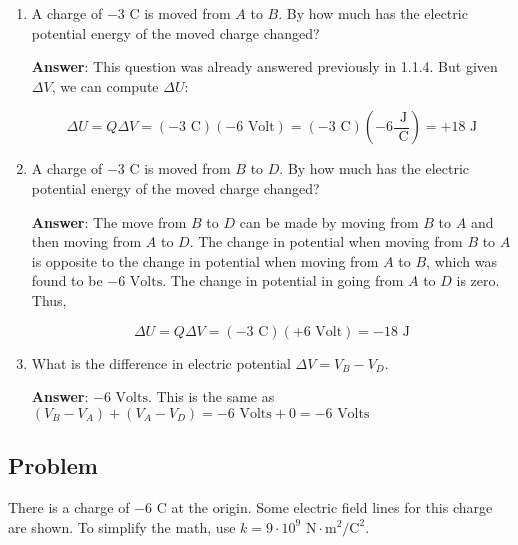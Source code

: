 \documentclass{article}
\begin{document}
\begin{enumerate}
        \vskip 48pt
        \fi

  \item A charge of $-3\text{ C}$ is moved from $A$ to $B$. By how much has the electric potential energy of the moved charge changed?

        \ifsolutions
        {\bf Answer}: This question was already answered previously in 1.1.4. But given $\Delta V$, we can compute $\Delta U$:

        $$
         \Delta U = Q\Delta V=(-3\text{ C})(-6\text{ Volt})=(-3\text{ C})\left(-6\frac{\text{ J}}{ \text{ C}}\right)=+18\text{ J}
        $$
        \else

        \vskip 48pt
        \fi

  \item A charge of $-3\text{ C}$ is moved from $B$ to $D$. By how much has the electric potential energy of the moved charge changed?

        \ifsolutions
        {\bf Answer}: The move from $B$ to $D$ can be made by moving from $B$ to $A$ and then moving from $A$ to $D$. The change in potential when moving from $B$ to $A$ is opposite to the change in potential when moving from $A$ to $B$, which was found to be $-6\text{ Volts}$. The change in potential in going from $A$ to $D$ is zero. Thus,

        $$
         \Delta U = Q\Delta V=(-3\text{ C})(+6\text{ Volt})=-18\text{ J}
        $$
        \else

        \vskip 48pt
        \fi

  \item What is the difference in electric potential $\Delta V = V_B-V_D$.

        \ifsolutions
        {\bf Answer}: $-6\text{ Volts}$. This is the same as $(V_B - V_A) + (V_A - V_D) = -6\text{ Volts} + 0 = -6\text{ Volts}$
        \else

        \vskip 48pt
        \fi

\end{enumerate}

\newpage

\subsection{Problem}

There is a charge of $-6\text{ C}$ at the origin. Some electric field lines for this charge are shown. To simplify the math, use $k=9\cdot 10^9\text{ N}\cdot\text{m}^2/\text{C}^2$.
\end{document}
